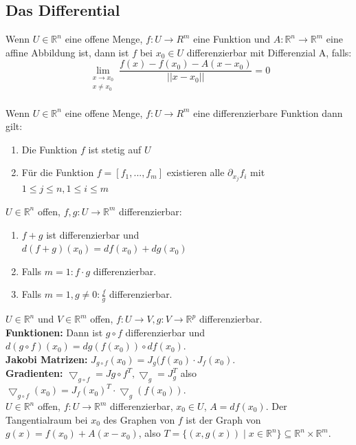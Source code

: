 \subsection{Das Differential}
  Wenn \(U\in\mathbb R^n\) eine offene Menge, \(f:U\rightarrow R^m\) eine Funktion und $A: \mathbb R^n\rightarrow\mathbb R^m$ eine affine Abbildung ist, dann ist $f$ bei $x_0\in U$ differenzierbar mit Differenzial A, falls:
  \[\lim\limits_{\substack{x\rightarrow x_0 \\ x\neq x_0}}\frac{f(x)-f(x_0)-A(x-x_0)}{||x-x_0||}=0\]\\
  Wenn \(U\in\mathbb R^n\) eine offene Menge, \(f:U\rightarrow R^m\) eine differenzierbare Funktion dann gilt:
  \begin{enumerate}
    \item Die Funktion $f$ ist stetig auf $U$
    \item Für die Funktion $f=[f_1,...,f_m]$ existieren alle \(\partial_{x_j}f_i\) mit \(1\leq j \leq n, 1\leq i\leq m\)
  \end{enumerate}
  \(U\in\mathbb R^n\) offen, \(f,g:U\rightarrow\mathbb R^m\) differenzierbar:
  \begin{enumerate}
    \item \(f+g\) ist differenzierbar und \\ $d(f+g)(x_0)=df(x_0)+dg(x_0)$
    \item Falls \(m=1: f\cdot g\) differenzierbar.
    \item Falls \(m=1, g\neq0:\frac f g\) differenzierbar.
  \end{enumerate}
 \(U\in\mathbb R^n\) und \(V\in\mathbb R^m\) offen, \(f:U\rightarrow V, g:V\rightarrow\mathbb R^p\) differenzierbar.\\
\textbf{Funktionen:} 
Dann ist $g\circ f$ differenzierbar und $d(g\circ f)(x_0)=dg(f(x_0))\circ df(x_0)$.\\
\textbf{Jakobi Matrizen:}
\(J_{g\circ f}(x_0)=J_g(f(x_0)\cdot J_f(x_0)\).\\
\textbf{Gradienten:}
\(\bigtriangledown_{g\circ f}=J{g\circ f}^T, \bigtriangledown_g=J_g^T\) also
\(\bigtriangledown_{g\circ f}(x_0)=J_f(x_0)^T\cdot\bigtriangledown_g(f(x_0))\).\\
  \(U\in\mathbb{R}^n\) offen, \(f: U\rightarrow\mathbb{R}^m\) differenzierbar, \(x_0\in U\), \(A=df(x_0)\). Der Tangentialraum bei \(x_0\) des Graphen von \(f\) ist der Graph von \(g(x)=f(x_0)+A(x-x_0)\), also \(T=\{(x,g(x))\mid x\in\mathbb{R}^n\}\subseteq\mathbb{R}^n\times\mathbb{R}^m\).\\
